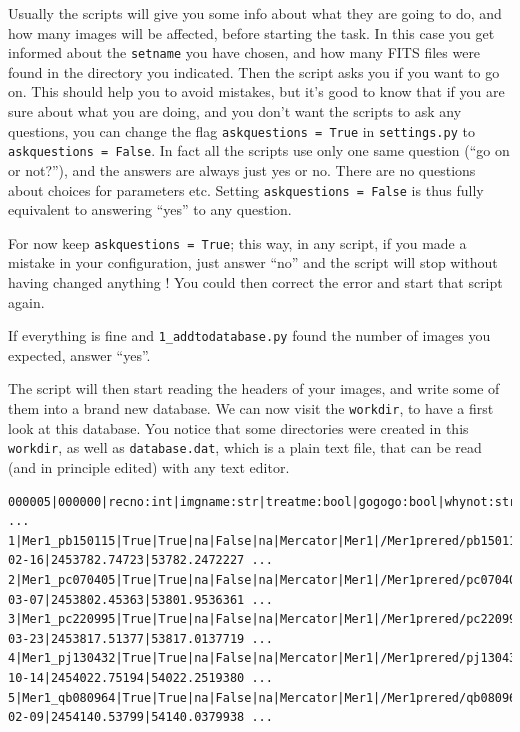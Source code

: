 Usually the scripts will give you some info about what they are going to do, and how many images will be affected, before starting the task. In this case you get informed about the \verb+setname+ you have chosen, and how many FITS files were found in the directory you indicated. Then the script asks you if you want to go on. This should help you to  avoid mistakes, but it's good to know that if you are sure about what you are doing, and you don't want the scripts to ask any questions, you can change the flag \verb+askquestions = True+ in \verb+settings.py+ to \verb+askquestions = False+. In fact all the scripts use only one same question (``go on or not?''), and the answers are always just yes or no. There are no questions about choices for parameters etc. Setting \verb+askquestions = False+ is thus fully equivalent to answering ``yes'' to any question.

For now keep \verb+askquestions = True+; this way, in any script, if you made a mistake in your configuration, just answer ``no'' and the script will stop without having changed anything ! You could then correct the error and start that script again.

If everything is fine and \verb+1_addtodatabase.py+ found the number of images you expected, answer ``yes''.

The script will then start reading the headers of your images, and write some of them into a brand new database. We can now visit the \verb+workdir+, to have a first look at this database. You notice that some directories were created in this  \verb+workdir+, as well as  \verb+database.dat+, which is a plain text file, that can be read (and in principle edited) with any text editor.

\begin{Verbatim}[fontsize=\relsize{-3}]
000005|000000|recno:int|imgname:str|treatme:bool|gogogo:bool|whynot:str|testlist:bool|testcomment:str|telescopename:str|setname:str ...
1|Mer1_pb150115|True|True|na|False|na|Mercator|Mer1|/Mer1prered/pb150115.fits|1.0|0.19340976|2006-02-16|2453782.74723|53782.2472227 ...
2|Mer1_pc070405|True|True|na|False|na|Mercator|Mer1|/Mer1prered/pc070405.fits|1.0|0.19340976|2006-03-07|2453802.45363|53801.9536361 ...
3|Mer1_pc220995|True|True|na|False|na|Mercator|Mer1|/Mer1prered/pc220995.fits|1.0|0.19340976|2006-03-23|2453817.51377|53817.0137719 ...
4|Mer1_pj130432|True|True|na|False|na|Mercator|Mer1|/Mer1prered/pj130432.fits|1.0|0.19340976|2006-10-14|2454022.75194|54022.2519380 ...
5|Mer1_qb080964|True|True|na|False|na|Mercator|Mer1|/Mer1prered/qb080964.fits|1.0|0.19340976|2007-02-09|2454140.53799|54140.0379938 ...
\end{Verbatim}


